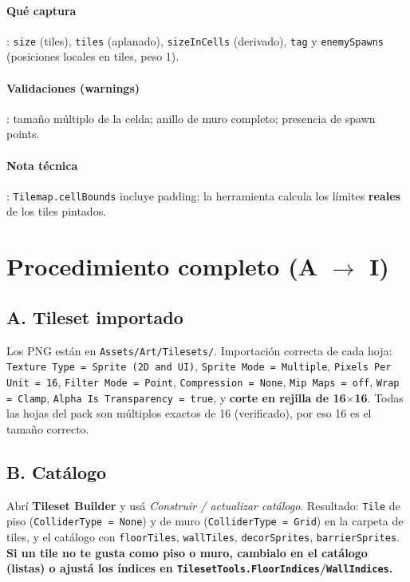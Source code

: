 \documentclass[11pt,a4paper]{article}
\newcommand{\code}[1]{\texttt{#1}}
\begin{document}
\paragraph{Qué captura}: \code{size} (tiles), \code{tiles} (aplanado), \code{sizeInCells} (derivado),
\code{tag} y \code{enemySpawns} (posiciones locales en tiles, peso 1).
\paragraph{Validaciones (warnings)}: tamaño múltiplo de la celda; anillo de muro completo; presencia de spawn points.
\paragraph{Nota técnica}: \code{Tilemap.cellBounds} incluye padding; la herramienta calcula los límites
\textbf{reales} de los tiles pintados.

\section{Procedimiento completo (A $\rightarrow$ I)}

\subsection*{A. Tileset importado}
Los PNG están en \code{Assets/Art/Tilesets/}. Importación correcta de cada hoja:
\code{Texture Type = Sprite (2D and UI)}, \code{Sprite Mode = Multiple}, \code{Pixels Per Unit = 16},
\code{Filter Mode = Point}, \code{Compression = None}, \code{Mip Maps = off}, \code{Wrap = Clamp},
\code{Alpha Is Transparency = true}, y \textbf{corte en rejilla de 16$\times$16}.
Todas las hojas del pack son múltiplos exactos de 16 (verificado), por eso 16 es el tamaño correcto.

\subsection*{B. Catálogo}
Abrí \textbf{Tileset Builder} y usá \emph{Construir / actualizar catálogo}.
Resultado: \code{Tile} de piso (\code{ColliderType = None}) y de muro (\code{ColliderType = Grid}) en la
carpeta de tiles, y el catálogo con \code{floorTiles}, \code{wallTiles}, \code{decorSprites}, \code{barrierSprites}.
\textbf{Si un tile no te gusta como piso o muro, cambialo en el catálogo (listas) o ajustá los índices
en \code{TilesetTools.FloorIndices}/\code{WallIndices}.}
\end{document}
